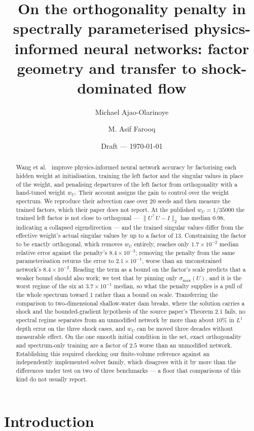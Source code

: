 \documentclass[11pt]{article}
\title{\textbf{On the orthogonality penalty in spectrally parameterised
physics-informed neural networks: factor geometry and transfer to
shock-dominated flow}}
\author[1]{Michael Ajao-Olarinoye}
\author[2]{M. Asif Farooq}
\affil[1]{Coventry University, UK}
\affil[2]{National University of Sciences and Technology, Islamabad, Pakistan}
\date{Draft --- \today}
\newcommand{\wU}{w_U}
\begin{document}
\maketitle

\begin{abstract}
Wang et al.~\cite{wang2026cnpinn} improve physics-informed neural network
accuracy by factorising each hidden weight at initialisation, training the
left factor and the singular values in place of the weight, and penalising
departures of the left factor from orthogonality with a hand-tuned weight
$\wU$. Their account assigns the gain to control over the weight spectrum. We
reproduce their advection case over 20 seeds and then measure the trained
factors, which their paper does not report. At the published
$\wU = 1/35000$ the trained left factor is not close to orthogonal ---
$\|U^\top U - I\|_2$ has median $0.98$, indicating a collapsed
eigendirection --- and the trained singular values differ from the effective
weight's actual singular values by up to a factor of 13. Constraining the
factor to be exactly orthogonal, which removes $\wU$ entirely, reaches only
$1.7\times10^{-2}$ median relative error against the penalty's
$8.4\times10^{-3}$; removing the penalty from the same parameterisation
returns the error to $2.1\times10^{-1}$, worse than an unconstrained
network's $8.4\times10^{-2}$. Reading the term as a bound on the factor's
scale predicts that a weaker bound should also work; we test that by pinning
only $\sigma_{\max}(U)$, and it is the worst regime of the six at
$3.7\times10^{-1}$ median, so what the penalty supplies is a pull of the whole
spectrum toward 1 rather than a bound on scale. Transferring the comparison to
two-dimensional shallow-water dam breaks, where the solution carries a shock
and the bounded-gradient hypothesis of the source paper's Theorem 2.1 fails,
no spectral regime separates from an unmodified network by more than about
10\% in $L^1$ depth error on the three shock cases, and $\wU$ can be moved
three decades without measurable effect. On the one smooth initial condition
in the set, exact orthogonality and spectrum-only training are a factor of
$2.5$ worse than an unmodified network. Establishing this required checking
our finite-volume reference against an independently implemented solver
family, which disagrees with it by more than the differences under test on
two of three benchmarks --- a floor that comparisons of this kind do not
usually report.
\end{abstract}

\section{Introduction}
\end{document}
